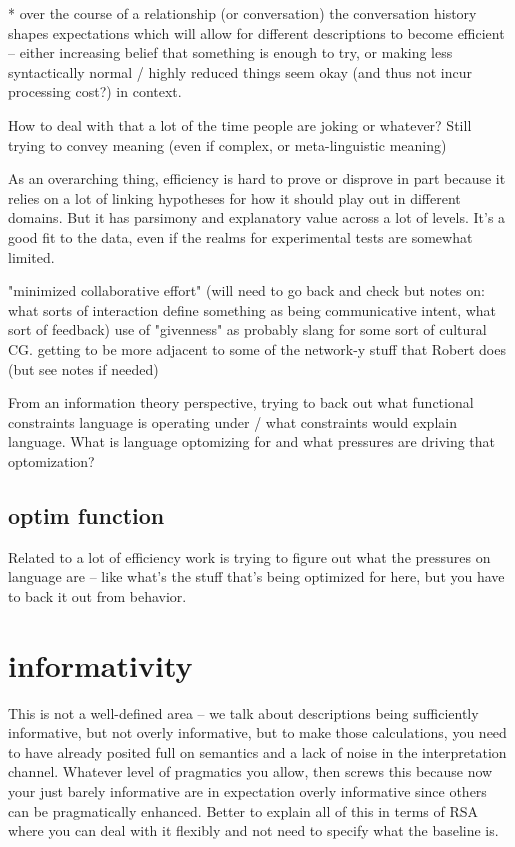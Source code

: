 \documentclass[]{article}
\begin{document}
* over the course of a relationship (or conversation) the conversation history shapes expectations which will allow for different descriptions to become efficient -- either increasing belief that something is enough to try, or making less syntactically normal / highly reduced things seem okay (and thus not incur processing cost?) in context. 

How to deal with that a lot of the time people are joking or whatever? Still trying to convey meaning (even if complex, or meta-linguistic meaning)

As an overarching thing, efficiency is hard to prove or disprove in part because it relies on a lot of linking hypotheses for how it should play out in different domains. But it has parsimony and explanatory value across a lot of levels. It's a good fit to the data, even if the realms for experimental tests are somewhat limited. 

\cite{fay2010} "minimized collaborative effort" (will need to go back and check but notes on: what sorts of interaction define something as being communicative intent, what sort of feedback) use of "givenness" as probably slang for some sort of cultural CG. getting to be more adjacent to some of the network-y stuff that Robert does (but see notes if needed) 


\cite{futrell2022} From an information theory perspective, trying to back out what functional constraints language is operating under / what constraints would explain language. What is language optomizing for and what pressures are driving that optomization? 
\subsection{optim function}

Related to a lot of efficiency work is trying to figure out what the pressures on language are -- like what's the stuff that's being optimized for here, but you have to back it out from behavior. 




\section{informativity}
This is not a well-defined area -- we talk about descriptions being sufficiently informative, but not overly informative, but to make those calculations, you need to have already posited full on semantics and a lack of noise in the interpretation channel. Whatever level of pragmatics you allow, then screws this because now your just barely informative are in expectation overly informative since others can be pragmatically enhanced. Better to explain all of this in terms of RSA where you can deal with it flexibly and not need to specify what the baseline is. 
\end{document}
